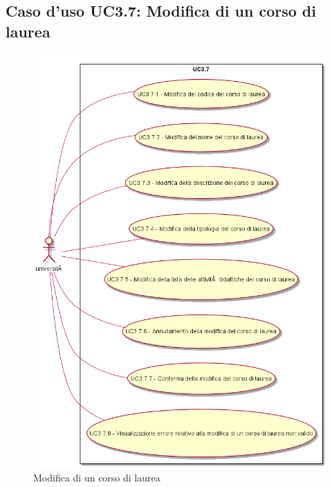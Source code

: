 \subsection{Caso d'uso \texorpdfstring{UC3.7}{UC3.7}: Modifica di un corso di laurea}
\begin{figure} [H]
\centering
\includegraphics[scale=0.45]{./img/UC3-7.png}
\caption{Modifica di un corso di laurea}\label{}
\end{figure}
